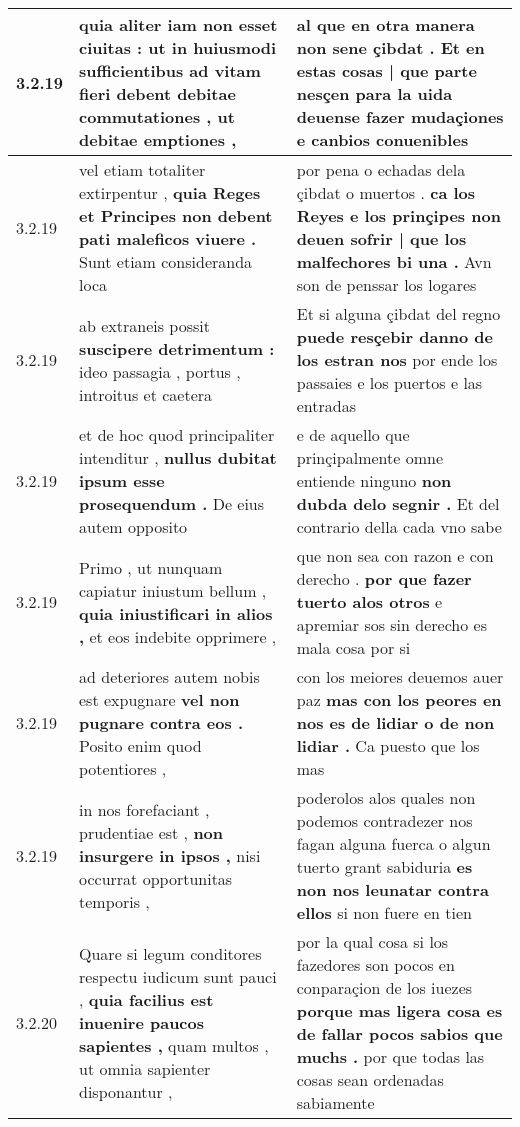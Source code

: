 \begin{tabular}{|p{1cm}|p{6.5cm}|p{6.5cm}|}
3.2.19 & quia aliter iam non esset ciuitas : \textbf{ ut in huiusmodi sufficientibus ad vitam fieri debent debitae commutationes , } ut debitae emptiones , & al que en otra manera non sene çibdat . \textbf{ Et en estas cosas | que parte nesçen para la uida deuense fazer mudaçiones } e canbios conuenibles \\\hline
3.2.19 & vel etiam totaliter extirpentur , \textbf{ quia Reges et Principes non debent pati maleficos viuere . } Sunt etiam consideranda loca & por pena o echadas dela çibdat o muertos . \textbf{ ca los Reyes e los prinçipes non deuen sofrir | que los malfechores bi una . } Avn son de penssar los logares \\\hline
3.2.19 & ab extraneis possit \textbf{ suscipere detrimentum : } ideo passagia , portus , introitus et caetera & Et si alguna çibdat del regno \textbf{ puede resçebir danno de los estran nos } por ende los passaies e los puertos e las entradas \\\hline
3.2.19 & et de hoc quod principaliter intenditur , \textbf{ nullus dubitat ipsum esse prosequendum . } De eius autem opposito & e de aquello que prinçipalmente omne entiende ninguno \textbf{ non dubda delo segnir . } Et del contrario della cada vno sabe \\\hline
3.2.19 & Primo , ut nunquam capiatur iniustum bellum , \textbf{ quia iniustificari in alios , } et eos indebite opprimere , & que non sea con razon e con derecho . \textbf{ por que fazer tuerto alos otros } e apremiar sos sin derecho es mala cosa por si \\\hline
3.2.19 & ad deteriores autem nobis est expugnare \textbf{ vel non pugnare contra eos . } Posito enim quod potentiores , & con los meiores deuemos auer paz \textbf{ mas con los peores en nos es de lidiar o de non lidiar . } Ca puesto que los mas \\\hline
3.2.19 & in nos forefaciant , prudentiae est , \textbf{ non insurgere in ipsos , } nisi occurrat opportunitas temporis , & poderolos alos quales non podemos contradezer nos fagan alguna fuerca o algun tuerto grant sabiduria \textbf{ es non nos leunatar contra ellos } si non fuere en tien \\\hline
3.2.20 & Quare si legum conditores respectu iudicum sunt pauci , \textbf{ quia facilius est inuenire paucos sapientes , } quam multos , ut omnia sapienter disponantur , & por la qual cosa si los fazedores son pocos en conparaçion de los iuezes \textbf{ porque mas ligera cosa es de fallar pocos sabios que muchs . } por que todas las cosas sean ordenadas sabiamente \\\hline

\end{tabular}

